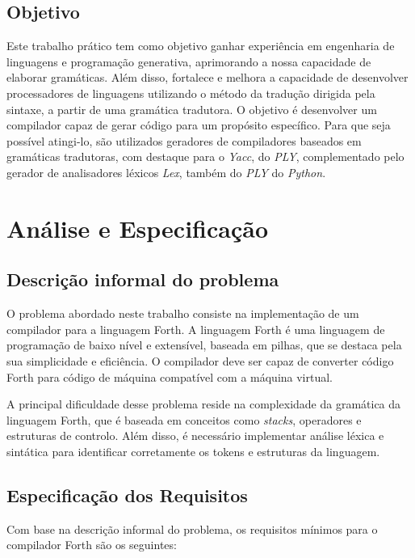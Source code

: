 \documentclass{predef}
\begin{document}
\subsection{Objetivo}
Este trabalho prático tem como objetivo ganhar experiência em engenharia de linguagens e programação generativa, aprimorando a nossa capacidade de elaborar gramáticas. Além disso, fortalece e melhora a capacidade de desenvolver processadores de linguagens utilizando o método da tradução dirigida pela sintaxe, a partir de uma gramática tradutora. O objetivo é desenvolver um compilador capaz de gerar código para um propósito específico. Para que seja possível atingi-lo, são utilizados geradores de compiladores baseados em gramáticas tradutoras, com destaque para o \textit{Yacc}, do \textit{PLY}, complementado pelo gerador de analisadores léxicos \textit{Lex}, também do \textit{PLY} do \textit{Python}.

\newpage
\section{Análise e Especificação}

\subsection{Descrição informal do problema}

O problema abordado neste trabalho consiste na implementação de um compilador para a linguagem Forth. A linguagem Forth é uma linguagem de programação de baixo nível e extensível, baseada em pilhas, que se destaca pela sua simplicidade e eficiência. O compilador deve ser capaz de converter código Forth para código de máquina compatível com a máquina virtual.

A principal dificuldade desse problema reside na complexidade da gramática da linguagem Forth, que é baseada em conceitos como \textit{stacks}, operadores e estruturas de controlo. Além disso, é necessário implementar análise léxica e sintática para identificar corretamente os tokens e estruturas da linguagem.

\subsection{Especificação dos Requisitos}

Com base na descrição informal do problema, os requisitos mínimos para o compilador Forth são os seguintes:
\end{document}
